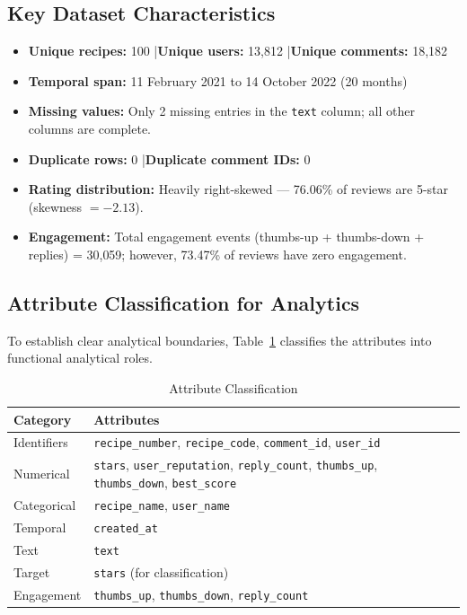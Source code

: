 \documentclass[12pt,a4paper]{article}
\begin{document}
\subsection{Key Dataset Characteristics}

\begin{itemize}[nosep]
    \item \textbf{Unique recipes:} 100 \quad|\quad \textbf{Unique users:} 13{,}812 \quad|\quad \textbf{Unique comments:} 18{,}182
    \item \textbf{Temporal span:} 11 February 2021 to 14 October 2022 (20 months)
    \item \textbf{Missing values:} Only 2 missing entries in the \texttt{text} column; all other columns are complete.
    \item \textbf{Duplicate rows:} 0 \quad|\quad \textbf{Duplicate comment IDs:} 0
    \item \textbf{Rating distribution:} Heavily right-skewed --- 76.06\% of reviews are 5-star (skewness $= -2.13$).
    \item \textbf{Engagement:} Total engagement events (thumbs-up + thumbs-down + replies) = 30{,}059; however, 73.47\% of reviews have zero engagement.
\end{itemize}

\subsection{Attribute Classification for Analytics}

To establish clear analytical boundaries, Table~\ref{tab:attr_class} classifies the attributes into functional analytical roles.

\begin{table}[H]
\centering
\caption{Attribute Classification}
\label{tab:attr_class}
\small
\begin{tabular}{l l}
\toprule
\textbf{Category} & \textbf{Attributes} \\
\midrule
Identifiers    & \texttt{recipe\_number}, \texttt{recipe\_code}, \texttt{comment\_id}, \texttt{user\_id} \\
Numerical      & \texttt{stars}, \texttt{user\_reputation}, \texttt{reply\_count}, \texttt{thumbs\_up}, \texttt{thumbs\_down}, \texttt{best\_score} \\
Categorical    & \texttt{recipe\_name}, \texttt{user\_name} \\
Temporal       & \texttt{created\_at} \\
Text           & \texttt{text} \\
Target         & \texttt{stars} (for classification) \\
Engagement     & \texttt{thumbs\_up}, \texttt{thumbs\_down}, \texttt{reply\_count} \\
\bottomrule
\end{tabular}
\end{table}
\end{document}
